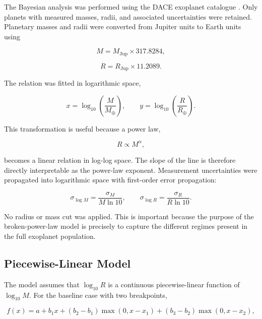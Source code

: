 \documentclass{article}
\numberwithin{equation}{section}
\begin{document}
The Bayesian analysis was performed using the DACE exoplanet catalogue \cite{dace_catalog}. Only planets with measured masses, radii, and associated uncertainties were retained. Planetary masses and radii were converted from Jupiter units to Earth units using

\begin{equation}
M = M_{\mathrm{Jup}} \times 317.8284,
\end{equation}

\begin{equation}
R = R_{\mathrm{Jup}} \times 11.2089.
\end{equation}

The relation was fitted in logarithmic space,

\begin{equation}
x = \log_{10}\left(\frac{M}{M_\oplus}\right),
\qquad
y = \log_{10}\left(\frac{R}{R_\oplus}\right).
\end{equation}

This transformation is useful because a power law,

\begin{equation}
R \propto M^\alpha,
\end{equation}

becomes a linear relation in log-log space. The slope of the line is therefore directly interpretable as the power-law exponent. Measurement uncertainties were propagated into logarithmic space with first-order error propagation:

\begin{equation}
\sigma_{\log M} =
\frac{\sigma_M}{M \ln 10},
\qquad
\sigma_{\log R} =
\frac{\sigma_R}{R \ln 10}.
\end{equation}

No radius or mass cut was applied. This is important because the purpose of the broken-power-law model is precisely to capture the different regimes present in the full exoplanet population.

\subsection{Piecewise-Linear Model}

The model assumes that $\log_{10} R$ is a continuous piecewise-linear function of $\log_{10} M$. For the baseline case with two breakpoints,

\begin{equation}
f(x)
=
a + b_1 x
+
(b_2-b_1)\max(0,x-x_1)
+
(b_3-b_2)\max(0,x-x_2),
\end{equation}
\end{document}
